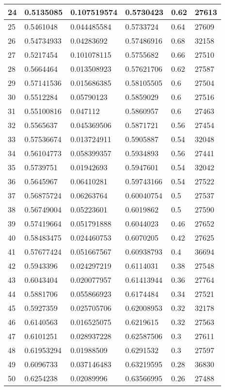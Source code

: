 \begin{longtable}{|l|l|l|l|l|l|}
24 & 0.5135085 & 0.107519574 & 0.5730423 & 0.62 & 27613 \\ \hline 
25 & 0.5461048 & 0.044485584 & 0.5733724 & 0.64 & 27609 \\ \hline 
26 & 0.54734933 & 0.04283692 & 0.57486916 & 0.68 & 32158 \\ \hline 
27 & 0.5217454 & 0.101078115 & 0.5755682 & 0.66 & 27510 \\ \hline 
28 & 0.5664464 & 0.013508923 & 0.57621706 & 0.62 & 27587 \\ \hline 
29 & 0.57141536 & 0.015686385 & 0.58105505 & 0.6 & 27504 \\ \hline 
30 & 0.5512284 & 0.05790123 & 0.5859029 & 0.6 & 27516 \\ \hline 
31 & 0.55100816 & 0.047112 & 0.5860957 & 0.6 & 27463 \\ \hline 
32 & 0.5565637 & 0.045369506 & 0.5871721 & 0.56 & 27454 \\ \hline 
33 & 0.57536674 & 0.013724911 & 0.5905887 & 0.54 & 32048 \\ \hline 
34 & 0.56104773 & 0.058399357 & 0.5934893 & 0.56 & 27441 \\ \hline 
35 & 0.5739751 & 0.01942693 & 0.5947601 & 0.54 & 32042 \\ \hline 
36 & 0.5645967 & 0.06410281 & 0.59743166 & 0.54 & 27522 \\ \hline 
37 & 0.56875724 & 0.06263764 & 0.60040754 & 0.5 & 27537 \\ \hline 
38 & 0.56749004 & 0.05223601 & 0.6019862 & 0.5 & 27590 \\ \hline 
39 & 0.57419664 & 0.051791888 & 0.6044023 & 0.46 & 27652 \\ \hline 
40 & 0.58483475 & 0.024460753 & 0.6070205 & 0.42 & 27625 \\ \hline 
41 & 0.57677424 & 0.051667567 & 0.60938793 & 0.4 & 36694 \\ \hline 
42 & 0.5943396 & 0.024297219 & 0.6114031 & 0.38 & 27548 \\ \hline 
43 & 0.6043404 & 0.020077957 & 0.61413944 & 0.36 & 27764 \\ \hline 
44 & 0.5881706 & 0.055866923 & 0.6174484 & 0.34 & 27521 \\ \hline 
45 & 0.5927359 & 0.025705706 & 0.62008953 & 0.32 & 32178 \\ \hline 
46 & 0.6140563 & 0.016525075 & 0.6219615 & 0.32 & 27563 \\ \hline 
47 & 0.6101251 & 0.028937228 & 0.62587506 & 0.3 & 27611 \\ \hline 
48 & 0.61953294 & 0.01988509 & 0.6291532 & 0.3 & 27597 \\ \hline 
49 & 0.6096733 & 0.037146483 & 0.63219595 & 0.28 & 36830 \\ \hline 
50 & 0.6254238 & 0.02089996 & 0.63566995 & 0.26 & 27488 \\ \hline 
\end{longtable}